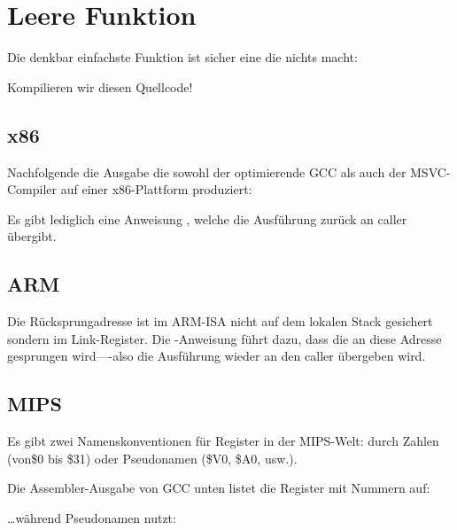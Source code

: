 \section{Leere Funktion}
\label{empty_func}

Die denkbar einfachste Funktion ist sicher eine die nichts macht:



Kompilieren wir diesen Quellcode!

\subsection{x86}
Nachfolgende die Ausgabe die sowohl der optimierende GCC als auch der MSVC-Compiler auf
einer x86-Plattform produziert:



Es gibt lediglich eine Anweisung \RET, welche die Ausführung zurück an \gls{caller} übergibt.

\subsection{ARM}


Die Rücksprungadresse ist im ARM-\ac{ISA} nicht auf dem lokalen Stack gesichert sondern im Link-Register.
Die -Anweisung führt dazu, dass die an diese Adresse gesprungen wird----also die Ausführung
wieder an den \gls{caller} übergeben wird.

\subsection{MIPS}
Es gibt zwei Namenskonventionen für Register in der MIPS-Welt:
durch Zahlen (von\$0 bis \$31) oder Pseudonamen (\$V0, \$A0, usw.).

Die Assembler-Ausgabe von GCC unten listet die Register mit Nummern auf:



\dots während \IDA Pseudonamen nutzt:



